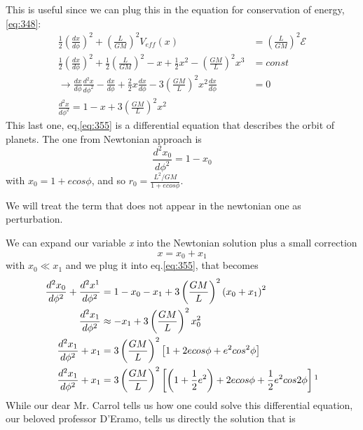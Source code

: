 This is useful since we can plug this in the equation for conservation of energy, \ref{eq:348}:
\begin{align}
	\frac{1}{2} \left( \frac{d x}{d \phi } \right)^{2} + \left( \frac{L}{GM} \right)^{2} V_{eff}\left( x \right) &= \left( \frac{L}{GM} \right)^{2} \mathcal{E} \nonumber\\ 
	\frac{1}{2} \left( \frac{d x}{d \phi } \right)^{2} + \frac{1}{2}\left( \frac{L}{GM} \right)^{2} - x + \frac{1}{2}x^{2} - \left( \frac{GM}{L} \right)^{2}x^{3} &= const \nonumber \\
	\to \frac{d x}{d \phi } \frac{d ^{2}x}{d \phi ^{2}} - \frac{d x}{d \phi } + \frac{2}{2}x \frac{d x}{d \phi } - 3 \left( \frac{GM}{L} \right)^{2}x^{2}\frac{d x}{d \phi } &=0\nonumber\\
	\frac{d ^{2}x}{d \phi ^{2}} = 1 - x + 3 \left( \frac{GM}{L} \right)^{2} x^{2} \label{eq:355}
\end{align}
This last one, eq,\ref{eq:355} is a differential equation that describes the orbit of planets. The one from Newtonian approach is 
\[
\frac{d^{2}x_{0} }{d \phi ^{2}} = 1 - x_{0}
\]
with $x_{0} = 1 + e cos \phi $, and so $r_{0} = \frac{L^{2}/GM}{1+e cos\phi }$.\par
We will treat the term that does not appear in the newtonian one as perturbation. \par
We can expand our variable \emph{x} into the Newtonian solution plus a small correction 
\begin{equation}\label{eq:xpansion}
x = x_{0} + x_{1} 
\end{equation}
with $x_{0} \ll x_{1}$
and we plug it into eq.\ref{eq:355}, that becomes
\begin{align}
	\frac{d ^{2}x_{0}}{d \phi ^{2}} + \frac{d ^{2}x^{1}}{d \phi ^{2}} &= 1 - x_{0} -x_{1} + 3\left( \frac{GM}{L} \right)^{2}\left( x_{0} +x_{1} \right)^{2} \\
	\frac{d ^{2}x_{1}}{d \phi ^{2}} &\approx -x_{1} + 3 \left( \frac{GM}{L} \right)^{2}x_{0}^{2} \\
	\frac{d ^{2}x_{1}}{d \phi^{2}} +x_{1} &= 3 \left( \frac{GM}{L} \right)^{2} \left[ 1 + 2ecos\phi + e^{2}cos^{2}\phi  \right] \\
	\frac{d ^{2}x_{1}}{d \phi ^{2}} + x_{1} &= 3\left( \frac{GM}{L} \right)^{2} \left[ \left( 1 + \frac{1}{2}e^{2} \right) + 2ecos\phi + \frac{1}{2}e^{2} cos 2\phi  \right] \footnotemark
\end{align}
While our dear Mr. Carrol tells us how one could solve this differential equation, our beloved professor D'Eramo, tells us directly the solution that is
